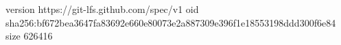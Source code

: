 version https://git-lfs.github.com/spec/v1
oid sha256:bf672bea3647fa83692e660e80073e2a887309e396f1e18553198ddd300f6e84
size 626416
